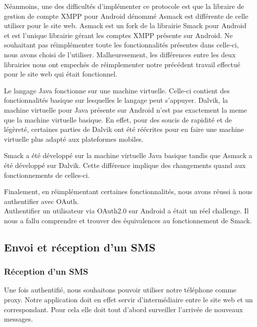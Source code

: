 Néanmoins, une des difficultés d'implémenter ce protocole est que la libraire de gestion de compte
XMPP pour Android dénommé Asmack est différente de celle utiliser pour le site web. Asmack est un fork 
de la librairie Smack pour Android et est l'unique librairie gérant les comptes XMPP présente sur
Android. Ne souhaitant pas réimplémenter toute les fonctionnalités présentes dans celle-ci, nous avons
choisi de l'utiliser. Malheuresement, les différences entre les deux librairies nous ont empechés de 
réimplementer notre précédent travail effectué pour le site web qui était fonctionnel. 

Le langage Java fonctionne sur une machine virtuelle. Celle-ci contient des fonctionnalités basique sur
lesquelles le langage peut s'appuyer. Dalvik, la machine virtuelle pour Java présente sur Android n'est 
pas exactement la meme que la machine virtuelle basique. En effet, pour des soucis de rapidité et de 
légèreté, certaines parties de Dalvik ont été réécrites pour en faire une machine virtuelle plus adapté
aux plateformes mobiles.

Smack a été développé sur la machine virtuelle Java basique tandis que Asmack a été développé sur Dalvik.
Cette différence implique des changements quand aux fonctionnements de celles-ci. 

Finalement, en réimplémentant certaines fonctionnalités, nous avons réussi à nous authentifier avec OAuth.
\\


Authentifier un utilisateur via OAuth2.0 sur Android a était un réel challenge. Il nous a fallu comprendre 
et trouver des équivalences au fonctionnement de Smack. 



\subsection{Envoi et réception d'un SMS}


\subsubsection{Réception d'un SMS}

Une fois authentifié, nous souhaitons pouvoir utiliser notre téléphone comme proxy. Notre application
doit en effet servir d'intermédiaire entre le site web et un correspondant. Pour cela elle doit tout
d'abord surveiller l'arrivée de nouveaux messages. 

